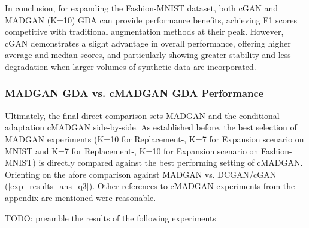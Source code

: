 In conclusion, for expanding the Fashion-MNIST dataset, both cGAN and MADGAN (K=10) GDA can provide performance benefits, achieving F1 scores competitive with traditional augmentation methods at their peak. However, cGAN demonstrates a slight advantage in overall performance, offering higher average and median scores, and particularly showing greater stability and less degradation when larger volumes of synthetic data are incorporated.

\newpage
\subsubsection[Question 4]{MADGAN GDA vs. cMADGAN GDA Performance}      \label{exp_results_ans_q4}
Ultimately, the final direct comparison sets MADGAN and the conditional adaptation cMADGAN side-by-side. As established before, the best selection of MADGAN experiments (K=10 for Replacement-, K=7 for Expansion scenario on MNIST and K=7 for Replacement-, K=10 for Expansion scenario on Fashion-MNIST) is directly compared against the best performing setting of cMADGAN. Orienting on the afore comparison against MADGAN vs. DCGAN/cGAN (\ref{exp_results_ans_q3}). Other references to cMADGAN experiments from the appendix are mentioned were reasonable. 

TODO: preamble the results of the following experiments

\newpage


